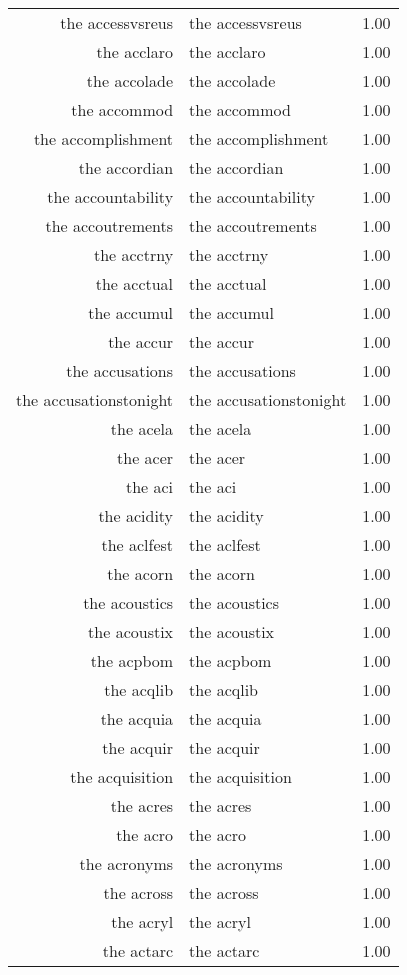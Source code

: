 \begin{table}[ht]
\begin{tabular}{rlr}
  the accessvsreus & the accessvsreus & 1.00 \\ 
  the acclaro & the acclaro & 1.00 \\ 
  the accolade & the accolade & 1.00 \\ 
  the accommod & the accommod & 1.00 \\ 
  the accomplishment & the accomplishment & 1.00 \\ 
  the accordian & the accordian & 1.00 \\ 
  the accountability & the accountability & 1.00 \\ 
  the accoutrements & the accoutrements & 1.00 \\ 
  the acctrny & the acctrny & 1.00 \\ 
  the acctual & the acctual & 1.00 \\ 
  the accumul & the accumul & 1.00 \\ 
  the accur & the accur & 1.00 \\ 
  the accusations & the accusations & 1.00 \\ 
  the accusationstonight & the accusationstonight & 1.00 \\ 
  the acela & the acela & 1.00 \\ 
  the acer & the acer & 1.00 \\ 
  the aci & the aci & 1.00 \\ 
  the acidity & the acidity & 1.00 \\ 
  the aclfest & the aclfest & 1.00 \\ 
  the acorn & the acorn & 1.00 \\ 
  the acoustics & the acoustics & 1.00 \\ 
  the acoustix & the acoustix & 1.00 \\ 
  the acpbom & the acpbom & 1.00 \\ 
  the acqlib & the acqlib & 1.00 \\ 
  the acquia & the acquia & 1.00 \\ 
  the acquir & the acquir & 1.00 \\ 
  the acquisition & the acquisition & 1.00 \\ 
  the acres & the acres & 1.00 \\ 
  the acro & the acro & 1.00 \\ 
  the acronyms & the acronyms & 1.00 \\ 
  the across & the across & 1.00 \\ 
  the acryl & the acryl & 1.00 \\ 
  the actarc & the actarc & 1.00 \\ 

\end{tabular}
\end{table}
